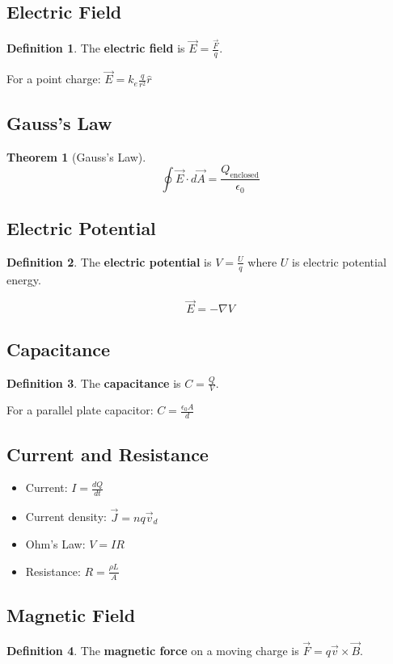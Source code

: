 \documentclass[11pt]{article}
\theoremstyle{definition}
\newtheorem{definition}{Definition}[section]
\newtheorem{theorem}{Theorem}[section]
\begin{document}
\subsection{Electric Field}
\begin{definition}
The \textbf{electric field} is $\vec{E} = \frac{\vec{F}}{q}$.
\end{definition}

For a point charge: $\vec{E} = k_e \frac{q}{r^2} \hat{r}$

\subsection{Gauss's Law}
\begin{theorem}[Gauss's Law]
$$\oint \vec{E} \cdot d\vec{A} = \frac{Q_{\text{enclosed}}}{\epsilon_0}$$
\end{theorem}

\subsection{Electric Potential}
\begin{definition}
The \textbf{electric potential} is $V = \frac{U}{q}$ where $U$ is electric potential energy.
\end{definition}

$$\vec{E} = -\nabla V$$

\subsection{Capacitance}
\begin{definition}
The \textbf{capacitance} is $C = \frac{Q}{V}$.
\end{definition}

For a parallel plate capacitor: $C = \frac{\epsilon_0 A}{d}$

\subsection{Current and Resistance}
\begin{itemize}
    \item Current: $I = \frac{dQ}{dt}$
    \item Current density: $\vec{J} = nq\vec{v}_d$
    \item Ohm's Law: $V = IR$
    \item Resistance: $R = \frac{\rho L}{A}$
\end{itemize}

\subsection{Magnetic Field}
\begin{definition}
The \textbf{magnetic force} on a moving charge is $\vec{F} = q\vec{v} \times \vec{B}$.
\end{definition}
\end{document}
